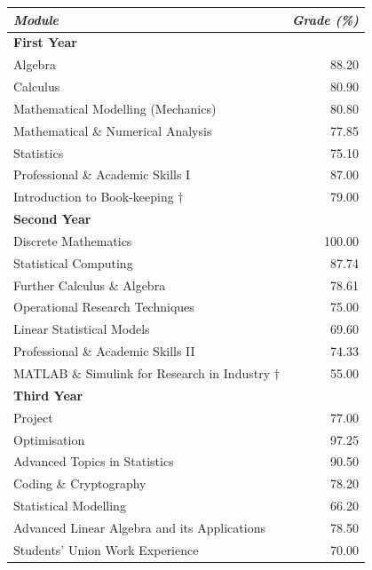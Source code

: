 \documentclass[9pt,a4paper]{article}
\begin{document}
\noindent
\begin{tabular}{p{9cm} | r}
	\emph{Module} & \emph{Grade (\%)} \\ \hline\hline
	\textbf{First Year} & \\\hline
	Algebra 											& 88.20\\
	Calculus											& 80.90\\
	Mathematical Modelling (Mechanics)					& 80.80\\
	Mathematical \& Numerical Analysis					& 77.85\\
	Statistics											& 75.10\\
	\hdashline
	Professional \& Academic Skills I					& 87.00\\
	Introduction to Book-keeping $\dagger$				& 79.00\\
	\hline\hline
	\textbf{Second Year} & \\\hline
	Discrete Mathematics								&100.00\\
	Statistical Computing								& 87.74\\
	Further Calculus \& Algebra							& 78.61\\
	Operational Research Techniques						& 75.00\\
	Linear Statistical Models							& 69.60\\
	\hdashline
	Professional \& Academic Skills II					& 74.33\\
	MATLAB \& Simulink for Research in Industry $\dagger$ & 55.00\\
	\hline\hline
	\textbf{Third Year} & \\\hline
	Project												& 77.00\\
	\hdashline
	Optimisation										& 97.25\\
	Advanced Topics in Statistics						& 90.50\\
	Coding \& Cryptography								& 78.20\\
	Statistical Modelling								& 66.20\\
	\hdashline
	Advanced Linear Algebra and its Applications		& 78.50\\
	Students' Union Work Experience						& 70.00
	
\end{tabular}


\pagebreak
\end{document}
